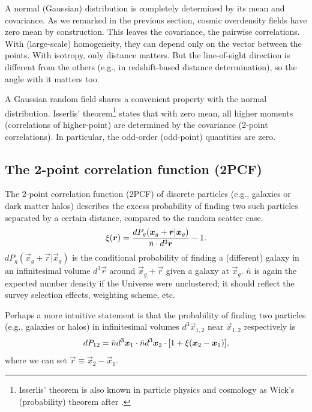 A normal (Gaussian) distribution is completely determined by its mean and covariance.
As we remarked in the previous section, cosmic overdensity fields have zero mean by construction.
This leaves the covariance, the pairwise correlations.
With (large-scale) homogeneity, they can depend only on the vector between the points.
With isotropy, only distance matters.
But the line-of-sight direction is different from the others (e.g., in redshift-based distance determination), so the angle with it matters too.

A Gaussian random field shares a convenient property with the normal distribution.
Isserlis' theorem\footnote{Isserlis' theorem is also known in particle physics and cosmology as Wick's (probability) theorem after \cite{Wicks-theorem}.} \citep{isserlis} states that with zero mean, all higher moments (correlations of higher-point) are determined by the covariance (2-point correlations).
In particular, the odd-order (odd-point) quantities are zero.

\subsection{The 2-point correlation function (2PCF)}

The 2-point correlation function (2PCF) of discrete particles (e.g., galaxies or dark matter halos) describes the excess probability of finding two such particles separated by a certain distance, compared to the random scatter case.
\begin{equation}
    \xi \qty(\bm r) = \frac{dP_g(\bm x_g + \bm r | \bm x_g)}{\bar n \cdot d^3 \bm r} - 1. \label{eq:2PCF-discrete-probability}
\end{equation}
$dP_g(\vec x_g + \vec r | \vec x_g)$ is the conditional probability of finding a (different) galaxy in an infinitesimal volume $d^3 \vec r$ around $\vec x_g + \vec r$ given a galaxy at $\vec x_g$.
$\bar n$ is again the expected number density if the Universe were unclustered; it should reflect the survey selection effects, weighting scheme, etc.

Perhaps a more intuitive statement is that the probability of finding two particles (e.g., galaxies or halos) in infinitesimal volumes $d^3\vec x_{1,2}$ near $\vec x_{1,2}$ respectively is
\begin{equation}
    dP_{12} = \bar n d^3\bm x_1 \cdot \bar n d^3\bm x_2 \cdot \qty[1+\xi\qty(\bm x_2 - \bm x_1)],
\end{equation}
where we can set $\vec r \equiv \vec x_2 - \vec x_1$.

